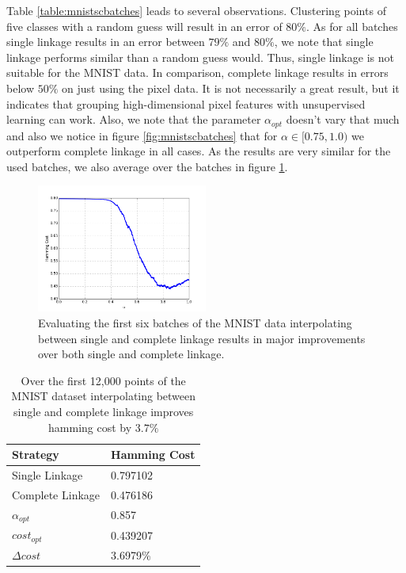 Table \ref{table:mnistscbatches} leads to several observations. Clustering points of five classes with a random guess will result in an error of $80\%$. As for all batches single linkage results in an error between $79\%$ and $80\%$, we note that single linkage performs similar than a random guess would. Thus, single linkage is not suitable for the MNIST data. In comparison, complete linkage results in errors below $50\%$ on just using the pixel data. It is not necessarily a great result, but it indicates that grouping high-dimensional pixel features with unsupervised learning can work. Also, we note that the parameter $\alpha_{opt}$ doesn't vary that much and also we notice in figure \ref{fig:mnistscbatches} that for $\alpha \in [0.75,1.0)$ we outperform complete linkage in all cases. As the results are very similar for the used batches, we also average over the batches in figure \ref{fig:mnistscbatchesavg}.

\begin{figure}[H]
    \centering
    \includegraphics[width=0.5\textwidth]{plots/mnist-sc-averaged.png}
    \caption{Evaluating the first six batches of the MNIST data interpolating between single and complete linkage results in major improvements over both single and complete linkage.}
    \label{fig:mnistscbatchesavg}
\end{figure}

\begin{table}[H]
    \centering
    \begin{tabular}{|l | l |}
    \hline
    Strategy & Hamming Cost\\ \hline
    Single Linkage & 0.797102\\
    Complete Linkage & 0.476186\\
    $\alpha_{opt}$ & 0.857\\
    $cost_{opt}$ & 0.439207\\
    $\Delta cost$ & 3.6979\%\\\hline
    \end{tabular}
    \caption{Over the first 12,000 points of the MNIST dataset interpolating between single and complete linkage improves hamming cost by $3.7\%$ }
    \label{table:mnist1000avgsc}
\end{table}

